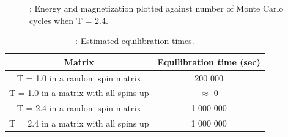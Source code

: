 \documentclass{article}
\begin{document}
{\begin{figure}
\caption{: Energy and magnetization plotted against number of Monte Carlo cycles when T = 2.4. }
\label{fig:steady_E_highT}
\end{figure}

{\renewcommand{\arraystretch}{1.5}
\begin{table}[h!]
  \caption{: Estimated equilibration times.}
    \label{Tab:equilibration_times}
    \centering
  \begin{tabular}{c c}
      Matrix & Equilibration time (sec)\\
      \hline
      T = 1.0 in a random spin matrix & 200 000  \\
      T = 1.0 in a matrix with all spins up & $\approx$ 0 \\
      T = 2.4 in a random spin matrix & 1 000 000\\
      T = 2.4 in a matrix with all spins up & 1 000 000\\
    \hline
  \end{tabular}
\end{table}

}}
\end{document}
